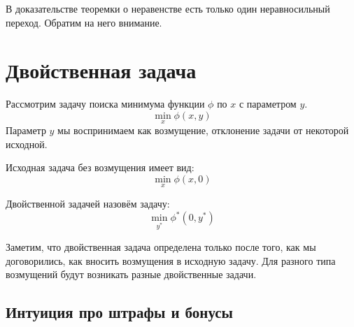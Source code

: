 \documentclass[
  letterpaper,
  DIV=11,
  numbers=noendperiod]{scrartcl}
\begin{document}
\begin{tcolorbox}[enhanced jigsaw, coltitle=black, colback=white, opacitybacktitle=0.6, colframe=quarto-callout-warning-color-frame, titlerule=0mm, leftrule=.75mm, bottomrule=.15mm, opacityback=0, toptitle=1mm, bottomtitle=1mm, arc=.35mm, colbacktitle=quarto-callout-warning-color!10!white, title=\textcolor{quarto-callout-warning-color}{\faExclamationTriangle}\hspace{0.5em}{Доказательство случая равенства}, rightrule=.15mm, breakable, toprule=.15mm, left=2mm]

В доказательстве теоремки о неравенстве есть только один неравносильный
переход. Обратим на него внимание.

\end{tcolorbox}

\section{Двойственная
задача}\label{ux434ux432ux43eux439ux441ux442ux432ux435ux43dux43dux430ux44f-ux437ux430ux434ux430ux447ux430}

\begin{tcolorbox}[enhanced jigsaw, coltitle=black, colback=white, opacitybacktitle=0.6, colframe=quarto-callout-note-color-frame, titlerule=0mm, leftrule=.75mm, bottomrule=.15mm, opacityback=0, toptitle=1mm, bottomtitle=1mm, arc=.35mm, colbacktitle=quarto-callout-note-color!10!white, title=\textcolor{quarto-callout-note-color}{\faInfo}\hspace{0.5em}{Правильное определение двойственной задачи}, rightrule=.15mm, breakable, toprule=.15mm, left=2mm]

Рассмотрим задачу поиска минимума функции \(\phi\) по \(x\) с параметром
\(y\). \[
\min_x \phi(x, y)
\] Параметр \(y\) мы воспринимаем как возмущение, отклонение задачи от
некоторой исходной.

Исходная задача без возмущения имеет вид: \[
\min_x \phi(x, 0)
\]

Двойственной задачей назовём задачу: \[
\min_{y^*} \phi^*(0, y^*)
\]

\end{tcolorbox}

Заметим, что двойственная задача определена только после того, как мы
договорились, как вносить возмущения в исходную задачу. Для разного типа
возмущений будут возникать разные двойственные задачи.

\subsection{Интуиция про штрафы и
бонусы}\label{ux438ux43dux442ux443ux438ux446ux438ux44f-ux43fux440ux43e-ux448ux442ux440ux430ux444ux44b-ux438-ux431ux43eux43dux443ux441ux44b}
\end{document}
